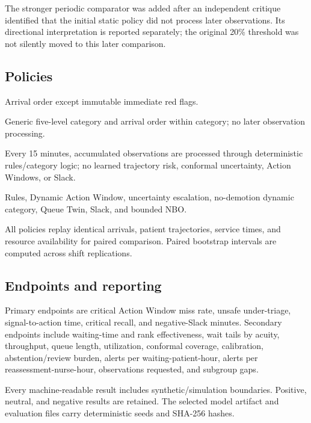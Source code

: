 \documentclass[11pt,a4paper]{article}
\begin{document}
The stronger periodic comparator was added after an independent critique identified that the initial static policy did not process later observations. Its directional interpretation is reported separately; the original 20\% threshold was not silently moved to this later comparison.

\subsection{Policies}

\begin{description}[style=nextline,leftmargin=0pt]
\item[P0 - FIFO] Arrival order except immutable immediate red flags.
\item[P1 - Initial static triage] Generic five-level category and arrival order within category; no later observation processing.
\item[P1b - Fixed periodic re-triage] Every 15 minutes, accumulated observations are processed through deterministic rules/category logic; no learned trajectory risk, conformal uncertainty, Action Windows, or Slack.
\item[P2 - TriageLoop] Rules, Dynamic Action Window, uncertainty escalation, no-demotion dynamic category, Queue Twin, Slack, and bounded NBO.
\end{description}

All policies replay identical arrivals, patient trajectories, service times, and resource availability for paired comparison. Paired bootstrap intervals are computed across shift replications.

\subsection{Endpoints and reporting}

Primary endpoints are critical Action Window miss rate, unsafe under-triage, signal-to-action time, critical recall, and negative-Slack minutes. Secondary endpoints include waiting-time and rank effectiveness, wait tails by acuity, throughput, queue length, utilization, conformal coverage, calibration, abstention/review burden, alerts per waiting-patient-hour, alerts per reassessment-nurse-hour, observations requested, and subgroup gaps.

Every machine-readable result includes synthetic/simulation boundaries. Positive, neutral, and negative results are retained. The selected model artifact and evaluation files carry deterministic seeds and SHA-256 hashes.
\end{document}
